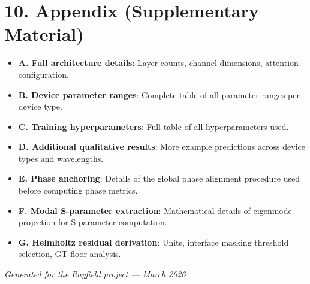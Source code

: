 \documentclass[11pt,letterpaper]{article}
\begin{document}
\section{10. Appendix (Supplementary Material)}

\begin{itemize}
    \item \textbf{A. Full architecture details}: Layer counts, channel dimensions, attention configuration.
    \item \textbf{B. Device parameter ranges}: Complete table of all parameter ranges per device type.
    \item \textbf{C. Training hyperparameters}: Full table of all hyperparameters used.
    \item \textbf{D. Additional qualitative results}: More example predictions across device types and wavelengths.
    \item \textbf{E. Phase anchoring}: Details of the global phase alignment procedure used before computing phase metrics.
    \item \textbf{F. Modal S-parameter extraction}: Mathematical details of eigenmode projection for S-parameter computation.
    \item \textbf{G. Helmholtz residual derivation}: Units, interface masking threshold selection, GT floor analysis.
\end{itemize}

\vfill
\begin{center}
\textit{Generated for the Rayfield project --- March 2026}
\end{center}
\end{document}
